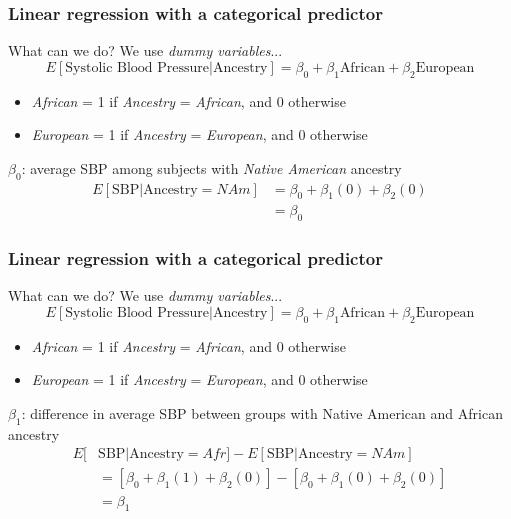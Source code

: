 \documentclass[12pt, 
hyperref={colorlinks=true, linkcolor=blue, urlcolor=cyan},dvipsnames]{beamer}
\begin{document}
\begin{frame}
\frametitle{Linear regression with a categorical predictor}
What can we do? \pause We use \textit{dummy variables}...
$$E[\text{Systolic Blood Pressure}|\text{Ancestry}] = \beta_0 + \beta_1 \text{African} + \beta_2 \text{European}$$

\vspace{-0.5cm}
\begin{itemize}
\item \textit{African} = 1 if \textit{Ancestry} = \textit{African}, and 0 otherwise
\item \textit{European} = 1 if \textit{Ancestry} = \textit{European}, and 0 otherwise
\end{itemize}\pause

$\beta_0$: average SBP among subjects with \textit{Native American} ancestry
\begin{align*}
E[\text{SBP}|\text{Ancestry} = NAm] &= \beta_0 + \beta_1(0) + \beta_2(0) \\
& = \beta_0
\end{align*}
\end{frame}

\begin{frame}
\frametitle{Linear regression with a categorical predictor}
What can we do? We use \textit{dummy variables}...
$$E[\text{Systolic Blood Pressure}|\text{Ancestry}] = \beta_0 + \beta_1 \text{African} + \beta_2 \text{European}$$

\vspace{-0.5cm}
\begin{itemize}
\item \textit{African} = 1 if \textit{Ancestry} = \textit{African}, and 0 otherwise
\item \textit{European} = 1 if \textit{Ancestry} = \textit{European}, and 0 otherwise
\end{itemize}

$\beta_1$: difference in average SBP between groups with Native American and African ancestry
\begin{align*}
E[&\text{SBP}|\text{Ancestry} = Afr] - E[\text{SBP}|\text{Ancestry} = NAm] \\
&= \left[\beta_0 + \beta_1(1) + \beta_2(0)\right] - \left[\beta_0 + \beta_1(0) + \beta_2(0) \right] \\
& = \beta_1
\end{align*}
\end{frame}
\end{document}
